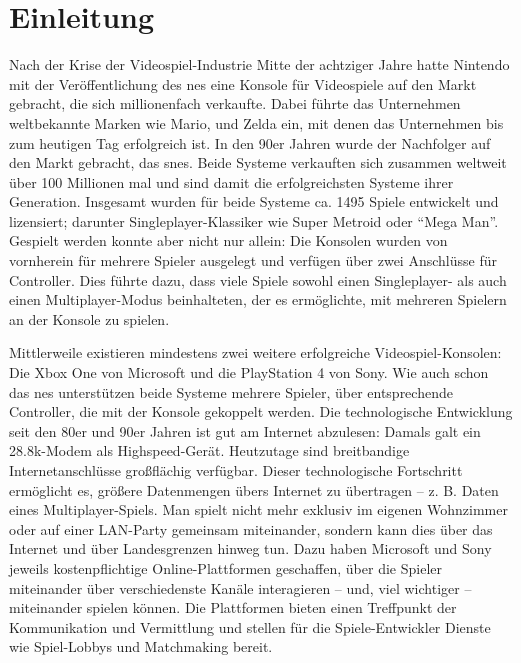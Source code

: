 
\chapter{Einleitung}\label{einleitung}

Nach der Krise der Videospiel-Industrie Mitte der achtziger Jahre hatte
Nintendo mit der Veröffentlichung des \gls{nes} eine Konsole für
Videospiele auf den Markt gebracht, die sich millionenfach verkaufte.
Dabei führte das Unternehmen weltbekannte Marken wie Mario,
 und Zelda ein, mit denen das Unternehmen bis zum
heutigen Tag erfolgreich ist. In den 90er Jahren wurde der Nachfolger
auf den Markt gebracht, das \gls{snes}. Beide Systeme verkauften sich
zusammen weltweit über 100 Millionen mal und sind damit die
erfolgreichsten Systeme ihrer Generation. Insgesamt wurden für beide
Systeme ca. 1495 Spiele entwickelt und lizensiert; darunter
Singleplayer-Klassiker wie Super Metroid oder \enquote{Mega Man}.
Gespielt werden konnte aber nicht nur allein: Die Konsolen wurden von
vornherein für mehrere Spieler ausgelegt und verfügen über zwei
Anschlüsse für Controller. Dies führte dazu, dass viele Spiele sowohl
einen Singleplayer- als auch einen Multiplayer-Modus beinhalteten, der
es ermöglichte, mit mehreren Spielern an der Konsole zu spielen.

Mittlerweile existieren mindestens zwei weitere erfolgreiche
Videospiel-Konsolen: Die Xbox One von Microsoft und die PlayStation 4
von Sony. Wie auch schon das \gls{nes} unterstützen beide Systeme
mehrere Spieler, über entsprechende Controller, die mit der Konsole
gekoppelt werden. Die technologische Entwicklung seit den 80er und 90er
Jahren ist gut am Internet abzulesen: Damals galt ein 28.8k-Modem als
Highspeed-Gerät. Heutzutage sind breitbandige Internetanschlüsse
großflächig verfügbar. Dieser technologische Fortschritt ermöglicht es,
größere Datenmengen übers Internet zu übertragen -- z. B. Daten eines
Multiplayer-Spiels. Man spielt nicht mehr exklusiv im eigenen Wohnzimmer
oder auf einer LAN-Party gemeinsam miteinander, sondern kann dies über
das Internet und über Landesgrenzen hinweg tun. Dazu haben Microsoft und
Sony jeweils kostenpflichtige Online-Plattformen geschaffen, über die
Spieler miteinander über verschiedenste Kanäle interagieren -- und, viel
wichtiger -- miteinander spielen können. Die Plattformen bieten einen
Treffpunkt der Kommunikation und Vermittlung und stellen für die
Spiele-Entwickler Dienste wie Spiel-Lobbys und Matchmaking bereit.

